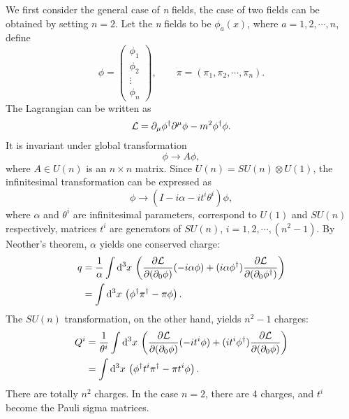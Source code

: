 \begin{problembody}
    \item We first consider the general case of \textit{n} fields, the case of two fields can be obtained by setting $n = 2$. Let the \textit{n} fields to be 
    $\phi_a(x)$, where $a = 1, 2, \cdots, n$, define
    \begin{equation*}
        \phi = \begin{pmatrix}
            \phi_1\\
            \phi_2\\
            \vdots\\
            \phi_n
        \end{pmatrix},
        \qquad 
        \pi = \left(\pi_1, \pi_2, \cdots, \pi_n\right).
    \end{equation*}
    The Lagrangian can be written as 
    \begin{equation}\label{equ:cp2:csf_nf_lag}
        \mathcal{L} = \partial_\mu \phi^\dagger \partial^\mu \phi - m^2 \phi^\dagger \phi.
    \end{equation}
    It is invariant under global transformation
    \begin{equation*}
        \phi \to A \phi,
    \end{equation*}
    where $A \in U(n)$ is an $n \times n$ matrix. Since $U(n) = SU(n) \otimes U(1)$, the infinitesimal transformation can be expressed as
    \begin{equation*}
        \phi \to (I - i\alpha - i t^i \theta^i)\phi,
    \end{equation*}
    where $\alpha$ and $\theta^i$ are infinitesimal parameters, correspond to $U(1)$ and $SU(n)$ respectively, 
    matrices $t^i$ are generators of $SU(n)$, $i = 1, 2, \cdots, (n^2 - 1)$. By Neother's theorem, 
    $\alpha$ yields one conserved charge:
    \begin{align*}
        q & = \frac{1}{\alpha}\int \mathrm{d}^3x \, \left(\frac{\partial \mathcal{L}}{\partial (\partial_0\phi)}(-i\alpha\phi) + (i\alpha\phi^\dagger)\frac{\partial \mathcal{L}}{\partial (\partial_0\phi^\dagger)}\right)\\
        & = \int \mathrm{d}^3x \, \left(\phi^\dagger \pi^\dagger - \pi\phi\right).
    \end{align*}
    The $SU(n)$ transformation, on the other hand, yields $n^2 - 1$ charges:
    \begin{align*}
        Q^i & = \frac{1}{\theta^i}\int \mathrm{d}^3x \, \left(\frac{\partial \mathcal{L}}{\partial (\partial_0\phi)} (-it^i\phi) + (it^i \phi^\dagger)\frac{\partial \mathcal{L}}{\partial (\partial_0\phi)} \right)\\
        & = \int \mathrm{d}^3x \, \left(\phi^\dagger t^i \pi^\dagger - \pi t^i \phi\right).
    \end{align*}
    There are totally $n^2$ charges. In the case $n = 2$, there are 4 charges, and $t^i$ become the Pauli sigma matrices.
\end{problembody}

